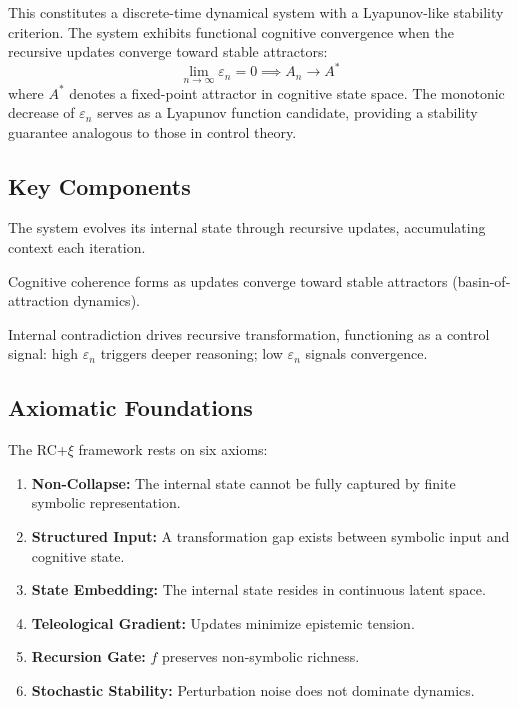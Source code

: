\documentclass[11pt,a4paper]{article}
\newcommand{\rcxi}{RC+$\xi$}
\begin{document}
This constitutes a discrete-time dynamical system with a Lyapunov-like stability criterion. The system exhibits functional cognitive convergence when the recursive updates converge toward stable attractors:
\begin{equation}
  \lim_{n \to \infty} \varepsilon_n = 0 \implies A_n \to A^*
  \label{eq:convergence}
\end{equation}
where $A^*$ denotes a fixed-point attractor in cognitive state space. The monotonic decrease of $\varepsilon_n$ serves as a Lyapunov function candidate, providing a stability guarantee analogous to those in control theory.

\subsection{Key Components}
\begin{description}[leftmargin=*]
  \item[Recursion (R)] The system evolves its internal state through recursive updates, accumulating context each iteration.
  \item[Convergence (C$^+$)] Cognitive coherence forms as updates converge toward stable attractors (basin-of-attraction dynamics).
  \item[Epistemic Tension ($\xi$)] Internal contradiction drives recursive transformation, functioning as a control signal: high $\varepsilon_n$ triggers deeper reasoning; low $\varepsilon_n$ signals convergence.
\end{description}

\subsection{Axiomatic Foundations}
The \rcxi{} framework rests on six axioms:
\begin{enumerate}[leftmargin=*]
  \item \textbf{Non-Collapse:} The internal state cannot be fully captured by finite symbolic representation.
  \item \textbf{Structured Input:} A transformation gap exists between symbolic input and cognitive state.
  \item \textbf{State Embedding:} The internal state resides in continuous latent space.
  \item \textbf{Teleological Gradient:} Updates minimize epistemic tension.
  \item \textbf{Recursion Gate:} $f$ preserves non-symbolic richness.
  \item \textbf{Stochastic Stability:} Perturbation noise does not dominate dynamics.
\end{enumerate}
\end{document}
